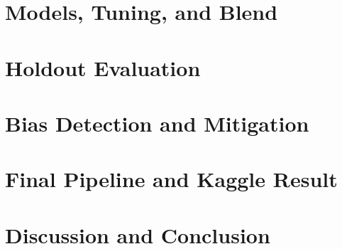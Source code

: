 \documentclass[pdflatex,sn-vancouver-num]{sn-jnl}
\theoremstyle{thmstyleone}
\theoremstyle{thmstyletwo}
\theoremstyle{thmstylethree}
\begin{document}
\section{Models, Tuning, and Blend}\label{sec:models}


\section{Holdout Evaluation}\label{sec:eval}


\section{Bias Detection and Mitigation}\label{sec:bias}


\section{Final Pipeline and Kaggle Result}\label{sec:final}


\section{Discussion and Conclusion}\label{sec:disc}



\end{document}
